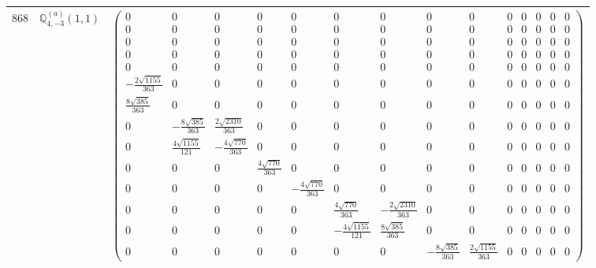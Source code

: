 \documentclass[fleqn,8pt,landscape]{jsarticle}
\begin{document}
\begin{center}
\begin{longtable}{ccc}
$ 868 $ & $ \mathbb{Q}_{4,-3}^{(a)}(1,1) $ & $ \begin{pmatrix} 0 & 0 & 0 & 0 & 0 & 0 & 0 & 0 & 0 & 0 & 0 & 0 & 0 & 0 \\ 0 & 0 & 0 & 0 & 0 & 0 & 0 & 0 & 0 & 0 & 0 & 0 & 0 & 0 \\ 0 & 0 & 0 & 0 & 0 & 0 & 0 & 0 & 0 & 0 & 0 & 0 & 0 & 0 \\ 0 & 0 & 0 & 0 & 0 & 0 & 0 & 0 & 0 & 0 & 0 & 0 & 0 & 0 \\ 0 & 0 & 0 & 0 & 0 & 0 & 0 & 0 & 0 & 0 & 0 & 0 & 0 & 0 \\ - \frac{2 \sqrt{1155}}{363} & 0 & 0 & 0 & 0 & 0 & 0 & 0 & 0 & 0 & 0 & 0 & 0 & 0 \\ \frac{8 \sqrt{385}}{363} & 0 & 0 & 0 & 0 & 0 & 0 & 0 & 0 & 0 & 0 & 0 & 0 & 0 \\ 0 & - \frac{8 \sqrt{385}}{363} & \frac{2 \sqrt{2310}}{363} & 0 & 0 & 0 & 0 & 0 & 0 & 0 & 0 & 0 & 0 & 0 \\ 0 & \frac{4 \sqrt{1155}}{121} & - \frac{4 \sqrt{770}}{363} & 0 & 0 & 0 & 0 & 0 & 0 & 0 & 0 & 0 & 0 & 0 \\ 0 & 0 & 0 & \frac{4 \sqrt{770}}{363} & 0 & 0 & 0 & 0 & 0 & 0 & 0 & 0 & 0 & 0 \\ 0 & 0 & 0 & 0 & - \frac{4 \sqrt{770}}{363} & 0 & 0 & 0 & 0 & 0 & 0 & 0 & 0 & 0 \\ 0 & 0 & 0 & 0 & 0 & \frac{4 \sqrt{770}}{363} & - \frac{2 \sqrt{2310}}{363} & 0 & 0 & 0 & 0 & 0 & 0 & 0 \\ 0 & 0 & 0 & 0 & 0 & - \frac{4 \sqrt{1155}}{121} & \frac{8 \sqrt{385}}{363} & 0 & 0 & 0 & 0 & 0 & 0 & 0 \\ 0 & 0 & 0 & 0 & 0 & 0 & 0 & - \frac{8 \sqrt{385}}{363} & \frac{2 \sqrt{1155}}{363} & 0 & 0 & 0 & 0 & 0 \end{pmatrix} $ \\ \hline

\end{longtable}
\end{center}
\end{document}
